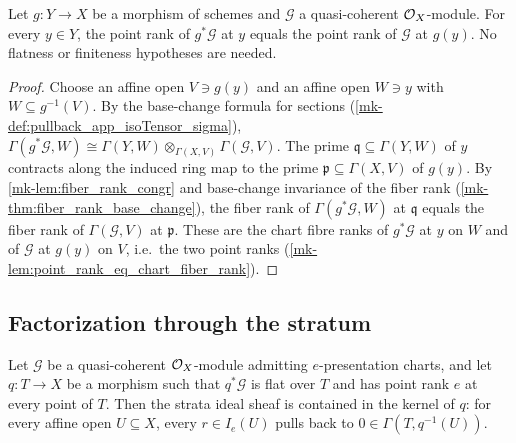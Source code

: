 \begin{theorem}
  \label{mk-thm:point_rank_pullback}
  \leanok

  Let \(g : Y \to X\) be a morphism of schemes and \(\mathcal G\) a
  quasi-coherent \(\mathcal{O}_X\)-module.  For every \(y \in Y\), the point rank of
  \(g^*\mathcal G\) at \(y\) equals the point rank of \(\mathcal G\) at
  \(g(y)\).  No flatness or finiteness hypotheses are needed.
\end{theorem}

\begin{proof}
  \leanok
  Choose an affine open \(V \ni g(y)\) and an affine open \(W \ni y\) with
  \(W \subseteq g^{-1}(V)\).  By the base-change formula for sections
  (\ref{mk-def:pullback_app_isoTensor_sigma}),
  \(\Gamma(g^*\mathcal G, W) \cong
    \Gamma(Y, W) \otimes_{\Gamma(X, V)} \Gamma(\mathcal G, V)\).  The prime
  \(\mathfrak q \subseteq \Gamma(Y, W)\) of \(y\) contracts along the
  induced ring map to the prime \(\mathfrak p \subseteq \Gamma(X, V)\) of
  \(g(y)\).  By \ref{mk-lem:fiber_rank_congr} and base-change invariance of
  the fiber rank (\ref{mk-thm:fiber_rank_base_change}), the fiber rank of
  \(\Gamma(g^*\mathcal G, W)\) at \(\mathfrak q\) equals the fiber rank of
  \(\Gamma(\mathcal G, V)\) at \(\mathfrak p\).  These are the chart fibre
  ranks of \(g^*\mathcal G\) at \(y\) on \(W\) and of \(\mathcal G\) at
  \(g(y)\) on \(V\), i.e.\ the two point ranks
  (\ref{mk-lem:point_rank_eq_chart_fiber_rank}).
\end{proof}

\subsection{Factorization through the stratum}

\begin{theorem}
  \label{mk-thm:strata_ideal_le_ker}
  \leanok

  Let \(\mathcal G\) be a quasi-coherent \(\mathcal{O}_X\)-module admitting
  \(e\)-presentation charts, and let \(q : T \to X\) be a morphism such that
  \(q^*\mathcal G\) is flat over \(T\) and has point rank \(e\) at every
  point of \(T\).  Then the strata ideal sheaf is contained in the kernel of
  \(q\): for every affine open \(U \subseteq X\), every \(r \in I_e(U)\)
  pulls back to \(0 \in \Gamma(T, q^{-1}(U))\).
\end{theorem}

